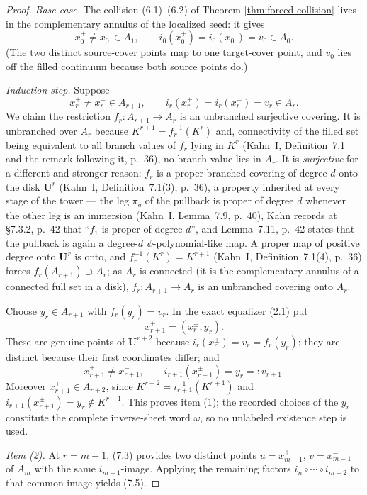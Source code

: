 \documentclass[11pt,reqno]{amsart}
\theoremstyle{definition}
\theoremstyle{remark}
\begin{document}
\begin{proof}
\emph{Base case.}  The collision (6.1)--(6.2) of Theorem \ref{thm:forced-collision} lives in the complementary annulus of the localized seed: it gives
\[
 x_0^+\ne x_0^-\in A_1,\qquad i_0(x_0^+)=i_0(x_0^-)=v_0\in A_0.  \tag{7.1}
\]
(The two distinct source-cover points map to one target-cover point, and \(v_0\) lies off the filled continuum because both source points do.)

\emph{Induction step.}  Suppose
\[
 x_r^+\ne x_r^-\in A_{r+1},\qquad i_r(x_r^+)=i_r(x_r^-)=v_r\in A_r.  \tag{7.2}
\]
We claim the restriction \(f_r\colon A_{r+1}\to A_r\) is an unbranched surjective covering.  It is unbranched over \(A_r\) because \(K^{r+1}=f_r^{-1}(K^r)\) and, connectivity of the filled set being equivalent to all branch values of \(f_r\) lying in \(K^r\) (Kahn~I, Definition~7.1 and the remark following it, p.~36), no branch value lies in \(A_r\).  It is \emph{surjective} for a different and stronger reason: \(f_r\) is a proper branched covering of degree \(d\) onto the disk \(\mathbf U^r\) (Kahn~I, Definition~7.1(3), p.~36), a property inherited at every stage of the tower --- the leg \(\pi_g\) of the pullback is proper of degree \(d\) whenever the other leg is an immersion (Kahn~I, Lemma~7.9, p.~40), Kahn records at \S7.3.2, p.~42 that ``\(f_1\) is proper of degree \(d\)'', and Lemma~7.11, p.~42 states that the pullback is again a degree-\(d\) \(\psi\)-polynomial-like map.  A proper map of positive degree onto \(\mathbf U^r\) is onto, and \(f_r^{-1}(K^r)=K^{r+1}\) (Kahn~I, Definition~7.1(4), p.~36) forces \(f_r(A_{r+1})\supset A_r\); as \(A_r\) is connected (it is the complementary annulus of a connected full set in a disk), \(f_r\colon A_{r+1}\to A_r\) is an unbranched covering onto \(A_r\).

Choose \(y_r\in A_{r+1}\) with \(f_r(y_r)=v_r\).  In the exact equalizer (2.1) put
\[
 x_{r+1}^{\pm}=(x_r^{\pm},y_r).
\]
These are genuine points of \(\mathbf U^{r+2}\) because \(i_r(x_r^{\pm})=v_r=f_r(y_r)\); they are distinct because their first coordinates differ; and
\[
 x_{r+1}^+\ne x_{r+1}^-,\qquad i_{r+1}(x_{r+1}^{\pm})=y_r=:v_{r+1}.  \tag{7.3}
\]
Moreover \(x_{r+1}^{\pm}\in A_{r+2}\), since \(K^{r+2}=i_{r+1}^{-1}(K^{r+1})\) and \(i_{r+1}(x_{r+1}^{\pm})=y_r\notin K^{r+1}\).  This proves item (1); the recorded choices of the \(y_r\) constitute the complete inverse-sheet word \(\omega\), so no unlabeled existence step is used.

\emph{Item (2).}  At \(r=m-1\), (7.3) provides two distinct points \(u=x_{m-1}^+\), \(v=x_{m-1}^-\) of \(A_m\) with the same \(i_{m-1}\)-image.  Applying the remaining factors \(i_n\circ\cdots\circ i_{m-2}\) to that common image yields (7.5).


\end{proof}
\end{document}

